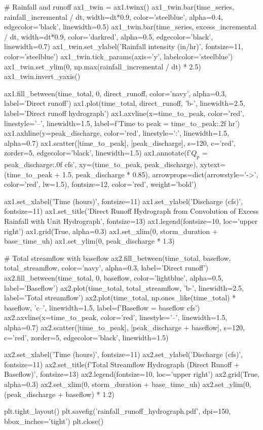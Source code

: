 \documentclass[a4paper, 11pt]{article}
\begin{document}
\begin{pycode}
# Rainfall and runoff
ax1_twin = ax1.twinx()
ax1_twin.bar(time_series, rainfall_incremental / dt, width=dt*0.9,
             color='steelblue', alpha=0.4, edgecolor='black', linewidth=0.5)
ax1_twin.bar(time_series, excess_incremental / dt, width=dt*0.9,
             color='darkred', alpha=0.5, edgecolor='black', linewidth=0.7)
ax1_twin.set_ylabel('Rainfall intensity (in/hr)', fontsize=11, color='steelblue')
ax1_twin.tick_params(axis='y', labelcolor='steelblue')
ax1_twin.set_ylim(0, np.max(rainfall_incremental / dt) * 2.5)
ax1_twin.invert_yaxis()

ax1.fill_between(time_total, 0, direct_runoff, color='navy', alpha=0.3, label='Direct runoff')
ax1.plot(time_total, direct_runoff, 'b-', linewidth=2.5, label='Direct runoff hydrograph')
ax1.axvline(x=time_to_peak, color='red', linestyle='--', linewidth=1.5,
            label=f'Time to peak = {time_to_peak:.2f} hr')
ax1.axhline(y=peak_discharge, color='red', linestyle=':', linewidth=1.5, alpha=0.7)
ax1.scatter([time_to_peak], [peak_discharge], s=120, c='red', zorder=5,
            edgecolor='black', linewidth=1.5)
ax1.annotate(f'$Q_p$ = {peak_discharge:.0f} cfs',
             xy=(time_to_peak, peak_discharge), xytext=(time_to_peak + 1.5, peak_discharge * 0.85),
             arrowprops=dict(arrowstyle='->', color='red', lw=1.5),
             fontsize=12, color='red', weight='bold')

ax1.set_xlabel('Time (hours)', fontsize=11)
ax1.set_ylabel('Discharge (cfs)', fontsize=11)
ax1.set_title('Direct Runoff Hydrograph from Convolution of Excess Rainfall with Unit Hydrograph',
              fontsize=13)
ax1.legend(fontsize=10, loc='upper right')
ax1.grid(True, alpha=0.3)
ax1.set_xlim(0, storm_duration + base_time_uh)
ax1.set_ylim(0, peak_discharge * 1.3)

# Total streamflow with baseflow
ax2.fill_between(time_total, baseflow, total_streamflow, color='navy', alpha=0.3, label='Direct runoff')
ax2.fill_between(time_total, 0, baseflow, color='lightblue', alpha=0.5, label='Baseflow')
ax2.plot(time_total, total_streamflow, 'b-', linewidth=2.5, label='Total streamflow')
ax2.plot(time_total, np.ones_like(time_total) * baseflow, 'c--', linewidth=1.5, label=f'Baseflow = {baseflow} cfs')
ax2.axvline(x=time_to_peak, color='red', linestyle='--', linewidth=1.5, alpha=0.7)
ax2.scatter([time_to_peak], [peak_discharge + baseflow], s=120, c='red', zorder=5,
            edgecolor='black', linewidth=1.5)

ax2.set_xlabel('Time (hours)', fontsize=11)
ax2.set_ylabel('Discharge (cfs)', fontsize=11)
ax2.set_title(f'Total Streamflow Hydrograph (Direct Runoff + Baseflow)', fontsize=13)
ax2.legend(fontsize=10, loc='upper right')
ax2.grid(True, alpha=0.3)
ax2.set_xlim(0, storm_duration + base_time_uh)
ax2.set_ylim(0, (peak_discharge + baseflow) * 1.2)

plt.tight_layout()
plt.savefig('rainfall_runoff_hydrograph.pdf', dpi=150, bbox_inches='tight')
plt.close()
\end{pycode}
\end{document}
